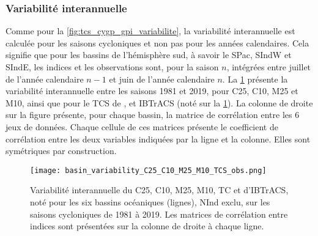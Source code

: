 \documentclass[../main.tex]{subfiles}
\begin{document}
\subsubsection{Variabilité interannuelle}\label{sec:variabilite_5_indices}

Comme pour la \cref{fig:tcs_cygp_gpi_variabilite}, la variabilité interannuelle est calculée pour les saisons cycloniques et non pas pour les années
calendaires. Cela signifie que pour les bassins de l'hémisphère sud, à savoir le SPac, SIndW et SIndE, les indices et les observations sont, pour la saison $n$,
intégrées entre juillet de l'année calendaire $n-1$ et juin de l'année calendaire $n$. La \cref{fig:variabilite_basin_5_indices} présente la variabilité
interannuelle entre les saisons \num{1981} et \num{2019}, pour C25, C10, M25 et M10, ainsi que pour le TCS de \textcite{tippett_poisson_2011}, et IBTrACS (noté
 sur la \cref{fig:variabilite_basin_5_indices}). La colonne de droite sur la figure présente, pour chaque bassin, la matrice de corrélation entre
les 6 jeux de données. Chaque cellule de ces matrices présente le coefficient de corrélation entre les deux variables indiquées par la ligne et la colonne.
Elles sont symétriques par construction.

\begin{figure}[p]
    \centering
    \texttt{[image: basin\_variability\_C25\_C10\_M25\_M10\_TCS\_obs.png]}
    \caption{Variabilité interannuelle du C25, C10, M25, M10, TC et d'IBTrACS, noté  pour les six bassins océaniques (lignes), NInd exclu, sur
    les saisons cycloniques de \num{1981} à \num{2019}. Les matrices de corrélation entre indices sont présentées sur la colonne de droite à chaque ligne.}
    \label{fig:variabilite_basin_5_indices}
\end{figure}
\end{document}

